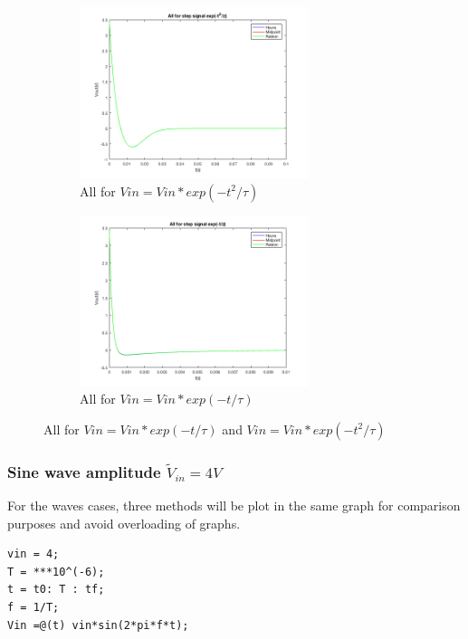 \documentclass[11pt,a4paper]{article}
\begin{document}
\begin{figure}[h]
\begin{subfigure}{.5\textwidth}
  \includegraphics[width=.9\linewidth,height = 5cm]{Ex1_Figs/all_t2.png}
  \caption[right]{All for $Vin = Vin*exp(-t^2/\tau)$}
  \label{fig:RL12}
\end{subfigure}
\begin{subfigure}{.5\textwidth}
  \includegraphics[width=.9\linewidth,height = 5cm]{Ex1_Figs/all_t.png}
  \caption{All for $Vin = Vin*exp(-t/\tau)$}
  \label{fig:RL13}
\end{subfigure}
\caption{All for $Vin = Vin*exp(-t/\tau)$ and $Vin = Vin*exp(-t^2/\tau)$}
\label{fig:test3}
\end{figure}

\FloatBarrier
\newpage
\subsubsection{Sine wave amplitude $\tilde{V}_{in} = 4V$}

For the waves cases, three methods will be plot in the same graph for comparison purposes and avoid overloading of graphs.

\begin{verbatim}
vin = 4;
T = ***10^(-6);
t = t0: T : tf;
f = 1/T;
Vin =@(t) vin*sin(2*pi*f*t);
\end{verbatim}
\end{document}

